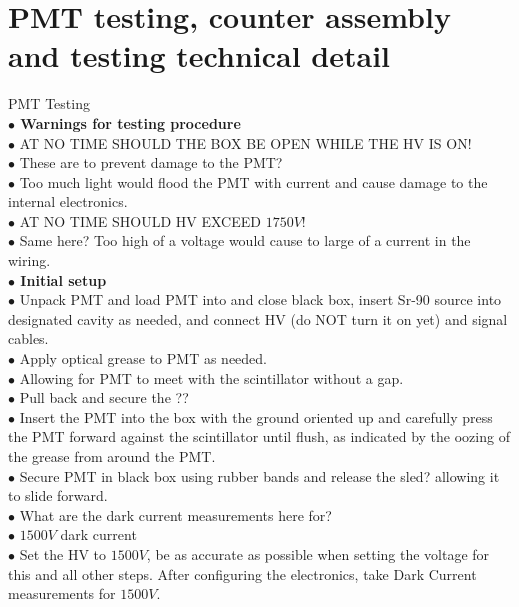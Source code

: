 \section{PMT testing, counter assembly and testing technical detail}

PMT Testing\\

\textbf{\color[rgb]{1,0.5,0}$\bullet$ Warnings for testing procedure}\\
$\bullet$ AT NO TIME SHOULD THE BOX BE OPEN WHILE THE HV IS ON!\\
{\color{blue}$\bullet$ These are to prevent damage to the PMT?} \\
{\color{blue}$\bullet$ Too much light would flood the PMT with current and cause damage to the internal electronics.} \\
$\bullet$ AT NO TIME SHOULD HV EXCEED $1750 V$!\\
{\color{blue}$\bullet$ Same here? Too high of a voltage would cause to large of a current in the wiring.} \\

\textbf{\color[rgb]{1,0.5,0}$\bullet$ Initial setup}\\
$\bullet$ Unpack PMT and load PMT into and close black box, insert Sr-90 source into designated cavity as needed, and connect HV (do NOT turn it on yet) and signal cables.\\
$\bullet$ Apply optical grease to PMT as needed.\\
{\color{blue}$\bullet$ Allowing for PMT to meet with the scintillator without a gap.}\\
$\bullet$ Pull back and secure the {\color{red} ??}\\
$\bullet$ Insert the PMT into the box with the ground oriented up and carefully press the PMT forward against the scintillator until flush, as indicated by the oozing of the grease from around the PMT.\\
$\bullet$ Secure PMT in black box using rubber bands and release the {\color{red}sled?} allowing it to slide forward.\\
{\color{blue}$\bullet$ What are the dark current measurements here for?} \\
$\bullet$ $1500 V$ dark current\\
$\bullet$ Set the HV to $1500 V$, be as accurate as possible when setting the voltage for this and all other steps. After configuring the electronics, take Dark Current measurements for $1500 V$.\\

